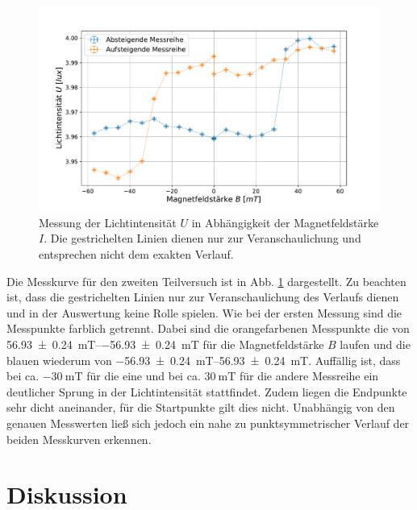 	\begin{figure}[ht]
		\centering
		\includegraphics[width=\textwidth]{data/Hysterese.pdf}
		\caption{Messung der Lichtintensität $U$ in Abhängigkeit der Magnetfeldstärke $I$. Die gestrichelten Linien dienen nur zur Veranschaulichung und entsprechen nicht dem exakten Verlauf.}
		\label{fig:Hysterese}	
	\end{figure}
	Die Messkurve für den zweiten Teilversuch ist in Abb. \ref{fig:Hysterese} dargestellt. 
	Zu beachten ist, dass die gestrichelten Linien nur zur Veranschaulichung des Verlaufs dienen und in der Auswertung keine Rolle spielen.
	Wie bei der ersten Messung sind die Messpunkte farblich getrennt.
	Dabei sind die orangefarbenen Messpunkte die von \SIrange{56.93+-0.24}{-56.93+-0.24}{\milli\tesla} für die Magnetfeldstärke $B$ laufen und die blauen wiederum von \SIrange{-56.93+-0.24}{56.93+-0.24}{\milli\tesla}.
	Auffällig ist, dass bei ca. $\SI{-30}{\milli\tesla}$ für die eine und bei ca. $\SI{30}{\milli\tesla}$ für die andere Messreihe ein deutlicher Sprung in der Lichtintensität stattfindet.
	Zudem liegen die Endpunkte sehr dicht aneinander, für die Startpunkte gilt dies nicht.
	Unabhängig von den genauen Messwerten ließ sich jedoch ein nahe zu punktsymmetrischer Verlauf der beiden Messkurven erkennen. 
			
\section{Diskussion}
			
